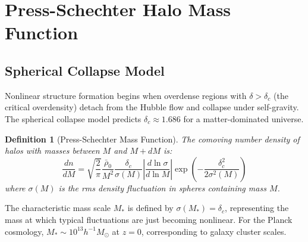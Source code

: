 \documentclass[a4paper, 11pt]{article}
\newtheorem{definition}{Definition}[section]
\begin{document}
\section{Press-Schechter Halo Mass Function}

\subsection{Spherical Collapse Model}

Nonlinear structure formation begins when overdense regions with $\delta > \delta_c$ (the
critical overdensity) detach from the Hubble flow and collapse under self-gravity. The
spherical collapse model predicts $\delta_c \approx 1.686$ for a matter-dominated universe.

\begin{definition}[Press-Schechter Mass Function]
The comoving number density of halos with masses between $M$ and $M + dM$ is:
\begin{equation}
\frac{dn}{dM} = \sqrt{\frac{2}{\pi}} \frac{\bar{\rho}_0}{M^2} \frac{\delta_c}{\sigma(M)}
\left|\frac{d\ln\sigma}{d\ln M}\right| \exp\left(-\frac{\delta_c^2}{2\sigma^2(M)}\right)
\end{equation}
where $\sigma(M)$ is the rms density fluctuation in spheres containing mass $M$.
\end{definition}

The characteristic mass scale $M_*$ is defined by $\sigma(M_*) = \delta_c$, representing
the mass at which typical fluctuations are just becoming nonlinear. For the Planck cosmology,
$M_* \sim 10^{13} h^{-1} M_{\odot}$ at $z=0$, corresponding to galaxy cluster scales.
\end{document}
